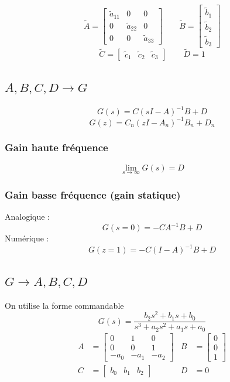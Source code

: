 \documentclass[resume]{subfiles}
\begin{document}
$$\tilde{A} = \begin{bmatrix}\tilde{a}_{11} &0 & 0\\0 & \tilde{a}_{22} & 0\\0 & 0 & \tilde{a}_{33}\end{bmatrix} \qquad \tilde{B}=\begin{bmatrix}\tilde{b}_{1}\\\tilde{b}_2\\\tilde{b}_3\end{bmatrix}$$
$$\tilde{C} = \begin{bmatrix}\tilde{c}_1 & \tilde{c}_2 & \tilde{c}_3\end{bmatrix}  \qquad \tilde{D}=1$$


\subsection{$A,B,C,D \longrightarrow G$}
$$G(s)=C(sI-A)^{-1}B+D$$
$$G(z)=C_n(zI-A_n)^{-1}B_n+D_n$$
\subsubsection{Gain haute fréquence}
$$\lim_{s\to\infty}G(s)=D$$
\subsubsection{Gain basse fréquence (gain statique)}
Analogique : $$G(s=0)=-CA^{-1}B+D$$
Numérique  : $$G(z=1)=-C(I-A)^{-1}B+D$$

\subsection{$G\longrightarrow A,B,C,D$}
On utilise la forme commandable
$$G(s)=\frac{b_2s^2+b_1s+b_0}{s^3+a_2s^2+a_1s+a_0}$$
$$\boxed{\begin{split}
A&=\begin{bmatrix}0 & 1 & 0\\0 & 0 &1\\-a_0 & -a_1 & -a_2\end{bmatrix} &
B&= \begin{bmatrix}
0\\0\\1
\end{bmatrix}\\
C&=\begin{bmatrix}b_0 & b_1 & b_2\end{bmatrix} & D&=0\end{split}}$$
\end{document}
